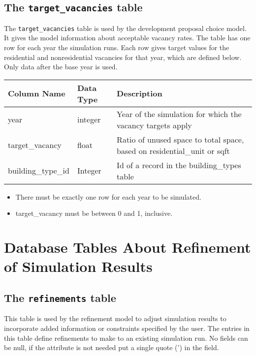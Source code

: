 \subsection{The {\tt target_vacancies} table}
\label{sec:table-target-vacancies-parcel}

The \verb|target_vacancies| table is used by the development proposal choice
model. It gives the model information about acceptable vacancy rates. The table
has one row for each year the simulation runs. Each row gives target values for
the residential and nonresidential vacancies for that year, which are defined
below.  Only data after the base year is used.

\begin{tabular}{lll}

\textbf{Column Name} & \textbf{Data Type} & \textbf{Description} \\

\hline year & integer & Year of the simulation for which the vacancy
targets
apply  \\

\hline target_vacancy & float & Ratio of unused 
space to total space, based on residential\_unit or sqft   \\

\hline building_type_id & Integer & Id of a record in the building_types table  \\

\hline
\end{tabular}

\begin{itemize}
\tight
\item There must be exactly one row for each year to be simulated.
\item target_vacancy must be between 0 and 1, inclusive.
\end{itemize}


\section{Database Tables About Refinement of Simulation Results}
\subsection{The {\tt refinements} table}
\label{sec:db-tables-refinements}

This table is used by the refinement model to adjust simulation results to incorporate added information or constraints specified by the user. The entries in this table define refinements to make to an existing simulation run. No fields can be null, if the attribute is not needed put a single quote (') in the field.

